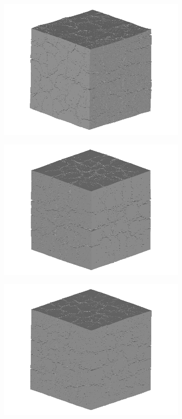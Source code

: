 \begin{figure}[ht!]
\centering
    \begin{subfigure}{.33\textwidth}
      \centering
      \includegraphics[width=.8\linewidth]{Files/exp_3D/ASR/A30P75_3_3d.png}
    \end{subfigure}%
    \begin{subfigure}{.33\textwidth}
      \centering
      \includegraphics[width=.8\linewidth]{Files/exp_3D/DEF/A30X0C_3_3d.png}
    \end{subfigure}%
    \begin{subfigure}{.33\textwidth}
      \centering
      \includegraphics[width=.8\linewidth]{Files/exp_3D/DEF/A30X-5C_3_3d.png}

\end{subfigure}
\end{figure}
